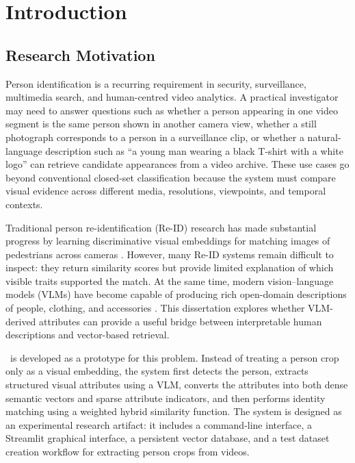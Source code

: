 \chapter{Introduction}
\label{ch:introduction}

\section{Research Motivation}

Person identification is a recurring requirement in security, surveillance, multimedia search, and human-centred video analytics. A practical investigator may need to answer questions such as whether a person appearing in one video segment is the same person shown in another camera view, whether a still photograph corresponds to a person in a surveillance clip, or whether a natural-language description such as ``a young man wearing a black T-shirt with a white logo'' can retrieve candidate appearances from a video archive. These use cases go beyond conventional closed-set classification because the system must compare visual evidence across different media, resolutions, viewpoints, and temporal contexts.

Traditional person re-identification (Re-ID) research has made substantial progress by learning discriminative visual embeddings for matching images of pedestrians across cameras \citep{zheng2016person,ye2021deep}. However, many Re-ID systems remain difficult to inspect: they return similarity scores but provide limited explanation of which visible traits supported the match. At the same time, modern vision--language models (VLMs) have become capable of producing rich open-domain descriptions of people, clothing, and accessories \citep{radford2021learning,bai2023qwenvl}. This dissertation explores whether VLM-derived attributes can provide a useful bridge between interpretable human descriptions and vector-based retrieval.

\systemname\ is developed as a prototype for this problem. Instead of treating a person crop only as a visual embedding, the system first detects the person, extracts structured visual attributes using a VLM, converts the attributes into both dense semantic vectors and sparse attribute indicators, and then performs identity matching using a weighted hybrid similarity function. The system is designed as an experimental research artifact: it includes a command-line interface, a Streamlit graphical interface, a persistent vector database, and a test dataset creation workflow for extracting person crops from videos.

